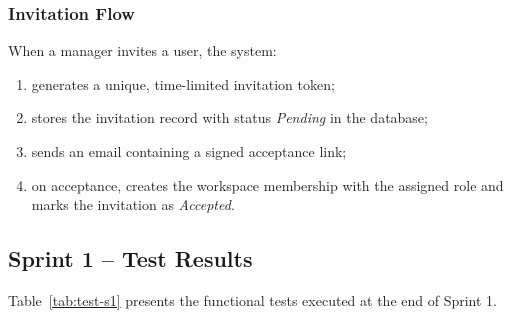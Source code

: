 ﻿\documentclass[12pt,a4paper]{report}
\begin{document}
\subsubsection{Invitation Flow}

When a manager invites a user, the system:
\begin{enumerate}
  \item generates a unique, time-limited invitation token;
  \item stores the invitation record with status \textit{Pending} in the database;
  \item sends an email containing a signed acceptance link;
  \item on acceptance, creates the workspace membership with the assigned role
        and marks the invitation as \textit{Accepted}.
\end{enumerate}

\subsection{Sprint 1 -- Test Results}

Table~\ref{tab:test-s1} presents the functional tests executed at the end of Sprint 1.
\end{document}
